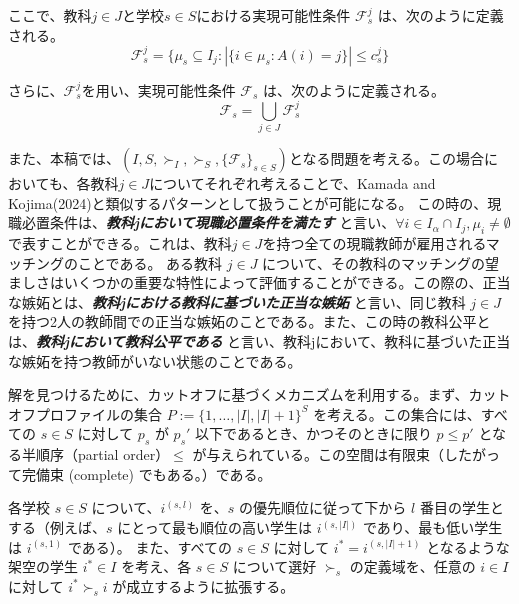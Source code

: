 \documentclass[12pt, a4paper]{article}
\theoremstyle{definition}
\theoremstyle{remark}
\theoremstyle{plain}
\begin{document}
ここで、教科$j \in J$と学校$s \in S$における実現可能性条件 $\mathcal{F}^j_s$ は、次のように定義される。
\[
\mathcal{F}^j_s = \{\mu_s \subseteq I_j : |\{i \in \mu_s : A(i) = j \}| \leq c^j_s \}
\]

さらに、$\mathcal{F}^j_s$を用い、実現可能性条件 $\mathcal{F}_s$ は、次のように定義される。
\[
\mathcal{F}_s = \bigcup_{j \in J} \mathcal{F}^j_s
\]



また、本稿では、$(I, S, \succ_I, \succ_S, \{\mathcal{F}_s\}_{s \in S})$となる問題を考える。この場合においても、各教科$j \in J$についてそれぞれ考えることで、Kamada and Kojima(2024)と類似するパターンとして扱うことが可能になる。
この時の、現職必置条件は、\textbf{\textit{教科jにおいて現職必置条件を満たす}} と言い、$\forall i \in I_\alpha \cap I_j, \mu_i \neq \emptyset$で表すことができる。これは、教科$j \in J$を持つ全ての現職教師が雇用されるマッチングのことである。
ある教科 $j \in J$ について、その教科のマッチングの望ましさはいくつかの重要な特性によって評価することができる。この際の、正当な嫉妬とは、\textbf{\textit{教科jにおける教科に基づいた正当な嫉妬}} と言い、同じ教科 $j \in J$ を持つ2人の教師間での正当な嫉妬のことである。また、この時の教科公平とは、\textbf{\textit{教科jにおいて教科公平である}} と言い、教科jにおいて、教科に基づいた正当な嫉妬を持つ教師がいない状態のことである。

解を見つけるために、カットオフに基づくメカニズムを利用する。まず、カットオフプロファイルの集合 \( P := \{ 1, \ldots, | I |, | I | + 1 \} ^S \) を考える。この集合には、すべての \( s \in S \) に対して \( p_s \) が \( p_s' \) 以下であるとき、かつそのときに限り \( p \leq p' \) となる半順序（partial order）\( \leq \) が与えられている。この空間は有限束（したがって完備束 (complete) でもある。）である。

各学校 \( s \in S\) について、\( i^{(s,l)} \) を、\( s \) の優先順位に従って下から \( l \) 番目の学生とする（例えば、\( s \) にとって最も順位の高い学生は \( i^{(s,|I|)} \) であり、最も低い学生は \( i^{(s,1)} \) である）。
また、すべての \( s \in S \) に対して \( i^* = i^{(s,|I|+1)} \) となるような架空の学生 \( i^* \in I \) を考え、各 \( s \in S \) について選好 \( \succ_s \) の定義域を、任意の \( i \in I \) に対して \( i^* \succ_s i \) が成立するように拡張する。



\end{document}
